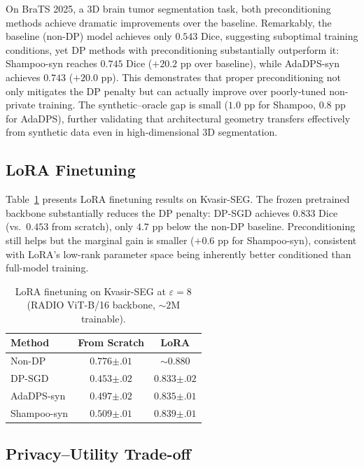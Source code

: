 \documentclass[runningheads]{llncs}
\begin{document}
On BraTS 2025, a 3D brain tumor segmentation task, both preconditioning methods achieve dramatic improvements over the baseline. Remarkably, the baseline (non-DP) model achieves only $0.543$ Dice, suggesting suboptimal training conditions, yet DP methods with preconditioning substantially outperform it: Shampoo-syn reaches $0.745$ Dice ($+20.2$ pp over baseline), while AdaDPS-syn achieves $0.743$ ($+20.0$ pp). This demonstrates that proper preconditioning not only mitigates the DP penalty but can actually improve over poorly-tuned non-private training. The synthetic--oracle gap is small ($1.0$ pp for Shampoo, $0.8$ pp for AdaDPS), further validating that architectural geometry transfers effectively from synthetic data even in high-dimensional 3D segmentation.

\subsection{LoRA Finetuning}
\label{subsec:lora}

Table~\ref{tab:lora} presents LoRA finetuning results on Kvasir-SEG. The frozen pretrained backbone substantially reduces the DP penalty: DP-SGD achieves $0.833$ Dice (vs.\ $0.453$ from scratch), only $4.7$ pp below the non-DP baseline. Preconditioning still helps but the marginal gain is smaller ($+0.6$ pp for Shampoo-syn), consistent with LoRA's low-rank parameter space being inherently better conditioned than full-model training.

\begin{table}[t]
\centering
\caption{LoRA finetuning on Kvasir-SEG at $\varepsilon{=}8$ (RADIO ViT-B/16 backbone, ${\sim}2$M trainable).}\label{tab:lora}
\renewcommand{\arraystretch}{1.15}
\small
\begin{tabular}{lcc}
\toprule
\textbf{Method} & \textbf{From Scratch} & \textbf{LoRA} \\
\midrule
Non-DP & $0.776{\scriptstyle\pm.01}$ & ${\sim}0.880$ \\
\midrule
DP-SGD & $0.453{\scriptstyle\pm.02}$ & $0.833{\scriptstyle\pm.02}$ \\
AdaDPS-syn & $0.497{\scriptstyle\pm.02}$ & $0.835{\scriptstyle\pm.01}$ \\
Shampoo-syn & $\mathbf{0.509}{\scriptstyle\pm.01}$ & $\mathbf{0.839}{\scriptstyle\pm.01}$ \\
\bottomrule
\end{tabular}
\end{table}

\subsection{Privacy--Utility Trade-off}
\label{subsec:epsilon_sweep}
\end{document}
